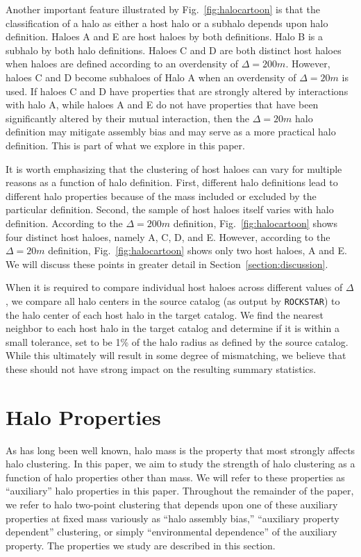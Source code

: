 \documentclass[usenatbib,fleqn]{mnras}
\begin{document}
Another important feature illustrated by Fig.~\ref{fig:halocartoon} is that the classification of a halo as either a host halo or a subhalo depends upon halo definition. Haloes A and E are host haloes by both definitions. Halo B is a subhalo by both halo definitions. Haloes C and D are both distinct host haloes when haloes are defined according to an overdensity of $\Delta=200m$. However, haloes C and D become subhaloes of Halo A when an overdensity of $\Delta=20m$ is used. If haloes C and D have properties that are strongly altered by interactions with halo A, while haloes A and E do not have properties that have been significantly altered by their mutual interaction, then the $\Delta=20m$ halo definition may mitigate assembly bias and may serve as a more practical halo definition. This is part of what we explore in this paper.

It is worth emphasizing that the clustering of host haloes can vary for multiple reasons as a function of halo definition. First, different halo definitions lead to different halo properties because of the mass included or excluded by the particular definition. Second, the sample of host haloes itself varies with halo definition. According to the $\Delta=200m$ definition, Fig.~\ref{fig:halocartoon} shows four distinct host haloes, namely A, C, D, and E. However, according to the $\Delta=20m$ definition, Fig.~\ref{fig:halocartoon} shows only two host haloes, A and E. We will discuss these points in greater detail in Section~\ref{section:discussion}.

When it is required to compare individual host haloes across different values of $\Delta$, we compare all halo centers in the source catalog (as output by {\tt ROCKSTAR}) to the halo center of each host halo in the target catalog. We find the nearest neighbor to each host halo in the target catalog and determine if it is within a small tolerance, set to be 1\% of the halo radius as defined by the source catalog. While this ultimately will result in some degree of mismatching, we believe that these should not have strong impact on the resulting summary statistics.
\section{Halo Properties}
\label{section:haloprops}

As has long been well known, halo mass is the property that most strongly affects halo clustering. In this paper, we aim to study the strength of halo clustering as a function of halo properties other than mass. We will refer to these properties as ``auxiliary'' halo properties in this paper. Throughout the remainder of the paper, we refer to halo two-point clustering that depends upon one of these auxiliary properties at fixed mass variously as ``halo assembly bias,'' ``auxiliary property dependent'' clustering, or simply ``environmental dependence'' of the auxiliary property. The properties we study are described in this section.
\end{document}
